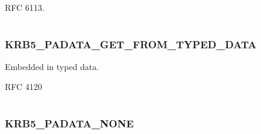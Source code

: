 \documentclass[letterpaper,10pt,english]{sphinxmanual}
\begin{document}
\begin{fulllineitems}
\label{appdev/refs/macros/KRB5_PADATA_FX_FAST:KRB5_PADATA_FX_FAST}
\end{fulllineitems}


RFC 6113.

\begin{tabulary}{\linewidth}{|L|L|}
\hline

 & 
\\\hline
\end{tabulary}



\subsubsection{KRB5\_PADATA\_GET\_FROM\_TYPED\_DATA}
\label{appdev/refs/macros/KRB5_PADATA_GET_FROM_TYPED_DATA:krb5-padata-get-from-typed-data-data}\label{appdev/refs/macros/KRB5_PADATA_GET_FROM_TYPED_DATA::doc}\label{appdev/refs/macros/KRB5_PADATA_GET_FROM_TYPED_DATA:krb5-padata-get-from-typed-data}

\begin{fulllineitems}
\label{appdev/refs/macros/KRB5_PADATA_GET_FROM_TYPED_DATA:KRB5_PADATA_GET_FROM_TYPED_DATA}
\end{fulllineitems}


Embedded in typed data.

RFC 4120

\begin{tabulary}{\linewidth}{|L|L|}
\hline

 & 
\\\hline
\end{tabulary}



\subsubsection{KRB5\_PADATA\_NONE}
\label{appdev/refs/macros/KRB5_PADATA_NONE:krb5-padata-none-data}\label{appdev/refs/macros/KRB5_PADATA_NONE:krb5-padata-none}\label{appdev/refs/macros/KRB5_PADATA_NONE::doc}

\begin{fulllineitems}
\label{appdev/refs/macros/KRB5_PADATA_NONE:KRB5_PADATA_NONE}
\end{fulllineitems}
\end{document}
